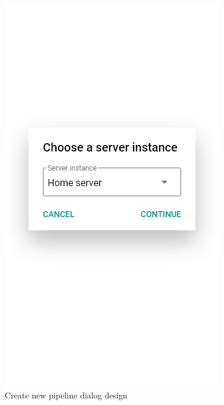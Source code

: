 \begin{figure}\centering
    \begin{minipage}[b]{0.32\textwidth}
    	\includegraphics[width=\textwidth]{pics/xd/Create new pipeline.png}
    	\caption[Create new pipeline dialog]{Create new pipeline dialog design}\label{fig:xdCreateNewPipelineDialog}
    \end{minipage}
    \begin{minipage}[b]{0.32\textwidth}

\end{minipage}
\end{figure}
